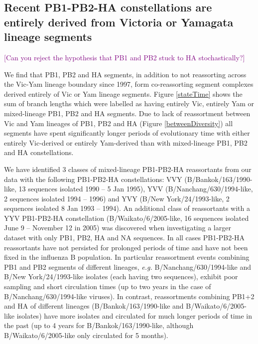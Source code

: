 \documentclass[11pt,oneside,letterpaper]{article}
\def\tbc#1{\textcolor{purple}{[#1]}}
\begin{document}
\subsection*{Recent PB1-PB2-HA constellations are entirely derived from Victoria or Yamagata lineage segments}
\tbc{Can you reject the hypothesis that PB1 and PB2 stuck to HA stochastically?}

We find that PB1, PB2 and HA segments, in addition to not reassorting across the Vic-Yam lineage boundary since 1997, form co-reassorting segment complexes derived entirely of Vic or Yam lineage segments.
Figure \ref{stateTime} shows the sum of branch lengths which were labelled as having entirely Vic, entirely Yam or mixed-lineage PB1, PB2 and HA segments.
Due to lack of reassortment between Vic and Yam lineages of PB1, PB2 and HA (Figure \ref{betweenDiversity}) all segments have spent significantly longer periods of evolutionary time with either entirely Vic-derived or entirely Yam-derived than with mixed-lineage PB1, PB2 and HA constellations.

We have identified 3 classes of mixed-lineage PB1-PB2-HA reassortants from our data with the following PB1-PB2-HA constellations: VVY (B/Bankok/163/1990-like, 13 sequences isolated 1990 -- 5 Jan 1995), YVV (B/Nanchang/630/1994-like, 2 sequences isolated 1994 -- 1996) and YVY (B/New York/24/1993-like, 2 sequences isolated 8 Jan 1993 -- 1994).
An additional class of reassortants with a YYV PB1-PB2-HA constellation (B/Waikato/6/2005-like, 16 sequences isolated June 9 -- November 12 in 2005) was discovered when investigating a larger dataset with only PB1, PB2, HA and NA sequences.
In all cases PB1-PB2-HA reassortants have not persisted for prolonged periods of time and have not been fixed in the influenza B population.
In particular reassortment events combining PB1 and PB2 segments of different lineages, \textit{e.g.} B/Nanchang/630/1994-like and B/New York/24/1993-like isolates (each having two sequences), exhibit poor sampling and short circulation times (up to two years in the case of B/Nanchang/630/1994-like viruses).
In contrast, reassortments combining PB1+2 and HA of different lineages (B/Bankok/163/1990-like and B/Waikato/6/2005-like isolates) have more isolates and circulated for much longer periods of time in the past (up to 4 years for B/Bankok/163/1990-like, although B/Waikato/6/2005-like only circulated for 5 months).
\end{document}
